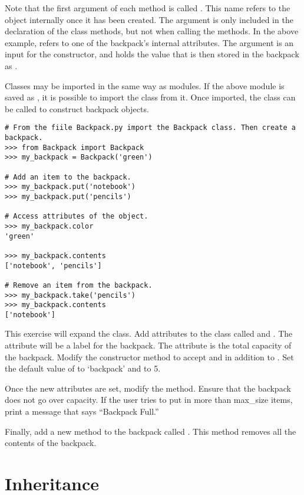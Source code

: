 Note that the first argument of each method is called .
This name refers to the object internally once it has been created.
The  argument is only included in the declaration of the class methods, but not when calling the methods.
In the above example,  refers to one of the backpack's internal attributes.
The argument  is an input for the constructor, and holds the value that is then stored in the backpack as .

Classes may be imported in the same way as modules.
If the above module is saved as , it is possible to import the  class from it.
Once imported, the  class can be called to construct backpack objects.
\begin{lstlisting}
# From the fiile Backpack.py import the Backpack class. Then create a backpack.
>>> from Backpack import Backpack
>>> my_backpack = Backpack('green')

# Add an item to the backpack.
>>> my_backpack.put('notebook')
>>> my_backpack.put('pencils')

# Access attributes of the object.
>>> my_backpack.color
'green'

>>> my_backpack.contents
['notebook', 'pencils']

# Remove an item from the backpack.
>>> my_backpack.take('pencils')
>>> my_backpack.contents
['notebook']
\end{lstlisting}

\begin{problem}
This exercise will expand the  class.
Add attributes to the class called  and .
The  attribute will be a label for the backpack.
The  attribute is the total capacity of the backpack.
Modify the constructor method to accept  and  in addition to .
Set the default value of  to `backpack' and  to 5.

Once the new attributes are set, modify the  method.
Ensure that the backpack does not go over capacity.
If the user tries to put in more than max\_size items, print a message that says ``Backpack Full.''

Finally, add a new method to the backpack called .
This method removes all the contents of the backpack.
\end{problem}

\section*{Inheritance}

